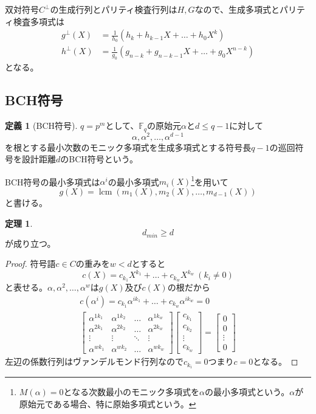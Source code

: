 \documentclass{jsarticle}
\newcommand{\F}{\mathbb{F}}
\renewcommand{\(}{\left(}
\renewcommand{\)}{\right)}
\DeclareMathOperator{\lcm}{lcm}
\theoremstyle{definition}
\newtheorem{dfn}{定義}
\newtheorem{thm}{定理}
\begin{document}
双対符号$C^\perp$の生成行列とパリティ検査行列は$H, G$なので、生成多項式とパリティ検査多項式は
\begin{align*}
    g^\perp(X) &= \frac{1}{h_0}(h_k + h_{k-1}X + \dots + h_0X^k)\\
    h^\perp(X) &= \frac{1}{g_0}(g_{n-k} + g_{n-k-1}X + \dots + g_0X^{n-k})
\end{align*}
となる。

\subsection{BCH符号}

\begin{dfn}[BCH符号]
    $q = p^m$として、$\F_q$の原始元$\alpha$と$d \leq q - 1$に対して
        \[\alpha, \alpha^2, \dots, \alpha^{d-1}\]
    を根とする最小次数のモニック多項式を生成多項式とする符号長$q - 1$の巡回符号を設計距離$d$のBCH符号という。
\end{dfn}

BCH符号の最小多項式は$\alpha^i$の最小多項式$m_i(X)$\footnote{$M(\alpha) = 0$となる次数最小のモニック多項式を$\alpha$の最小多項式という。$\alpha$が原始元である場合、特に原始多項式という。}を用いて
    \[g(X) = \lcm(m_1(X), m_2(X), \dots, m_{d-1}(X))\]
と書ける。

\begin{thm}
        \[d_{min} \geq d\]
    が成り立つ。
\end{thm}
\begin{proof}
    符号語$c \in C$の重みを$w < d$とすると
        \[c(X) = c_{k_1}X^{k_1} + \dots + c_{k_w}X^{k_w}\ (k_i \neq 0)\]
    と表せる。$\alpha, \alpha^2, \dots, \alpha^{w}$は$g(X)$及び$c(X)$の根だから
    \begin{align*}
        c(\alpha^i) = c_{k_1}\alpha^{ik_1} + \dots + c_{k_w}\alpha^{ik_w} = 0\\
        \begin{bmatrix}
            \alpha^{1k_1} & \alpha^{1k_2} & \dots & \alpha^{1k_w}\\
            \alpha^{2k_1} & \alpha^{2k_2} & \dots & \alpha^{2k_w}\\
            \vdots & \vdots & \ddots & \vdots\\
            \alpha^{wk_1} & \alpha^{wk_2} & \dots & \alpha^{wk_w}
        \end{bmatrix}
        \begin{bmatrix}
            c_{k_1}\\
            c_{k_2}\\
            \vdots\\
            c_{k_w}
        \end{bmatrix}
        =
        \begin{bmatrix}
            0\\
            0\\
            \vdots\\
            0
        \end{bmatrix}
    \end{align*}
    左辺の係数行列はヴァンデルモンド行列なので$c_{k_i} = 0$つまり$c = 0$となる。
\end{proof}
\end{document}
